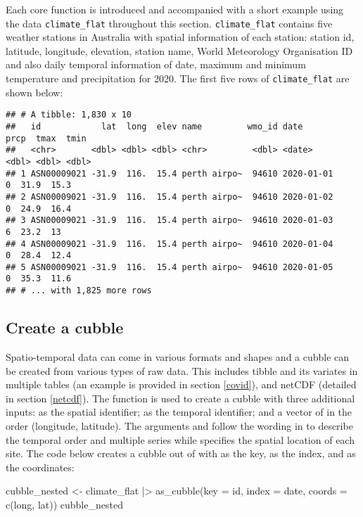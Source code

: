 \documentclass{article}
\newenvironment{Shaded}{\begin{snugshade}}{\end{snugshade}}
\newcommand{\AttributeTok}[1]{\textcolor[rgb]{0.77,0.63,0.00}{#1}}
\newcommand{\FunctionTok}[1]{\textcolor[rgb]{0.00,0.00,0.00}{#1}}
\newcommand{\NormalTok}[1]{#1}
\newcommand{\OtherTok}[1]{\textcolor[rgb]{0.56,0.35,0.01}{#1}}
\newcommand{\SpecialCharTok}[1]{\textcolor[rgb]{0.00,0.00,0.00}{#1}}
\begin{document}
Each core  function is introduced and accompanied with a short example using the data \texttt{climate\_flat} throughout this section. \texttt{climate\_flat} contains five weather stations in Australia with spatial information of each station: station id, latitude, longitude, elevation, station name, World Meteorology Organisation ID and also daily temporal information of date, maximum and minimum temperature and precipitation for 2020. The first five rows of \texttt{climate\_flat} are shown below:

\begin{verbatim}
## # A tibble: 1,830 x 10
##   id            lat  long  elev name         wmo_id date        prcp  tmax  tmin
##   <chr>       <dbl> <dbl> <dbl> <chr>         <dbl> <date>     <dbl> <dbl> <dbl>
## 1 ASN00009021 -31.9  116.  15.4 perth airpo~  94610 2020-01-01     0  31.9  15.3
## 2 ASN00009021 -31.9  116.  15.4 perth airpo~  94610 2020-01-02     0  24.9  16.4
## 3 ASN00009021 -31.9  116.  15.4 perth airpo~  94610 2020-01-03     6  23.2  13  
## 4 ASN00009021 -31.9  116.  15.4 perth airpo~  94610 2020-01-04     0  28.4  12.4
## 5 ASN00009021 -31.9  116.  15.4 perth airpo~  94610 2020-01-05     0  35.3  11.6
## # ... with 1,825 more rows
\end{verbatim}

\hypertarget{create}{%
\subsection{Create a cubble}\label{create}}

Spatio-temporal data can come in various formats and shapes and a cubble can be created from various types of raw data. This includes tibble and its variates in multiple tables (an example is provided in section \ref{covid}), and netCDF (detailed in section \ref{netcdf}). The function  is used to create a cubble with three additional inputs:  as the spatial identifier;  as the temporal identifier; and a vector of  in the order (longitude, latitude). The arguments  and  follow the wording in  to describe the temporal order and multiple series while  specifies the spatial location of each site. The code below creates a cubble out of  with  as the key,  as the index, and  as the coordinates:

\begin{Shaded}
\begin{Highlighting}[]
\NormalTok{cubble\_nested }\OtherTok{\textless{}{-}}\NormalTok{ climate\_flat }\SpecialCharTok{|\textgreater{}}
  \FunctionTok{as\_cubble}\NormalTok{(}\AttributeTok{key =}\NormalTok{ id, }\AttributeTok{index =}\NormalTok{ date, }\AttributeTok{coords =} \FunctionTok{c}\NormalTok{(long, lat))}
\NormalTok{cubble\_nested}
\end{Highlighting}
\end{Shaded}
\end{document}
